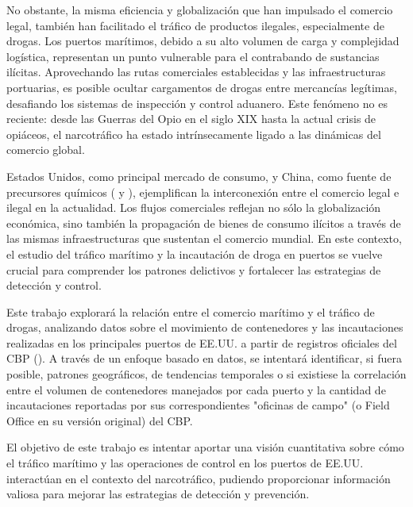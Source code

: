 \documentclass[12pt]{article}
\begin{document}
	No obstante, la misma eficiencia y globalización que han impulsado el comercio legal, también han facilitado el tráfico de productos ilegales, especialmente de drogas. Los puertos marítimos, debido a su alto volumen de carga y complejidad logística, representan un punto vulnerable para el contrabando de sustancias ilícitas. Aprovechando las rutas comerciales establecidas y las infraestructuras portuarias, es posible ocultar cargamentos de drogas entre mercancías legítimas, desafiando los sistemas de inspección y control aduanero. Este fenómeno no es reciente: desde las Guerras del Opio en el siglo XIX hasta la actual crisis de opiáceos, el narcotráfico ha estado intrínsecamente ligado a las dinámicas del comercio global.
	
	Estados Unidos, como principal mercado de consumo, y China, como fuente de precursores químicos (\cite{justice2023indictments} y \cite{justice2023fentanyl}), ejemplifican la interconexión entre el comercio legal e ilegal en la actualidad. Los flujos comerciales reflejan no sólo la globalización económica, sino también la propagación de bienes de consumo ilícitos a través de las mismas infraestructuras que sustentan el comercio mundial. En este contexto, el estudio del tráfico marítimo y la incautación de droga en puertos se vuelve crucial para comprender los patrones delictivos y fortalecer las estrategias de detección y control.
	
	Este trabajo explorará la relación entre el comercio marítimo y el tráfico de drogas, analizando datos sobre el movimiento de contenedores y las incautaciones realizadas en los principales puertos de EE.UU. a partir de registros oficiales del CBP (\cite{cbp_website}). A través de un enfoque basado en datos, se intentará identificar, si fuera posible, patrones geográficos, de tendencias temporales o si existiese la correlación entre el volumen de contenedores manejados por cada puerto y la cantidad de incautaciones reportadas por sus correspondientes "oficinas de campo" (o Field Office en su versión original) del CBP.
	
	El objetivo de este trabajo es intentar aportar una visión cuantitativa sobre cómo el tráfico marítimo y las operaciones de control en los puertos de EE.UU. interactúan en el contexto del narcotráfico, pudiendo proporcionar información valiosa para mejorar las estrategias de detección y prevención.
	
	
\end{document}
